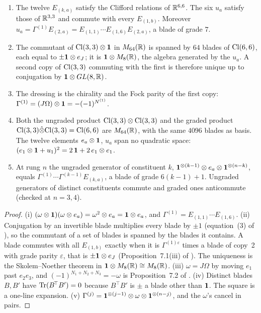 \begin{proposition}
\label{e1:prop:copies}
\begin{enumerate}[label=(\roman*),leftmargin=2.2em]
\item The twelve $E_{(k,a)}$ satisfy the Clifford relations of $\mathbb{R}^{6,6}$. The six $u_a$ satisfy those of $\mathbb{R}^{3,3}$ and commute with every
$E_{(1,b)}$. Moreover $u_a=\Gamma^{(1)}E_{(2,a)}=E_{(1,1)}\cdots E_{(1,6)}E_{(2,a)}$, a blade of grade $7$.
\item The commutant of $\mathrm{Cl}(3,3)\otimes\mathbf 1$ in $M_{64}(\mathbb{R})$ is spanned by $64$ blades of $\mathrm{Cl}(6,6)$, each equal to $\pm\mathbf 1\otimes e_J$; it is
$\mathbf 1\otimes M_8(\mathbb{R})$, the algebra generated by the $u_a$. A second copy of $\mathrm{Cl}(3,3)$ commuting with the first is therefore unique up to
conjugation by $\mathbf 1\otimes GL(8,\mathbb{R})$.
\item The dressing is the chirality and the Fock parity of the first copy: $\Gamma^{(1)}=(J\Omega)\otimes\mathbf 1=-(-1)^{N^{(1)}}$.
\item Both the ungraded product $\mathrm{Cl}(3,3)\otimes\mathrm{Cl}(3,3)$ and the graded product $\mathrm{Cl}(3,3)\hat\otimes\mathrm{Cl}(3,3)=\mathrm{Cl}(6,6)$ are $M_{64}(\mathbb{R})$, with
the same $4096$ blades as basis. The twelve elements $e_a\otimes\mathbf 1$, $u_a$ span no quadratic space: $(e_1\otimes\mathbf 1+u_1)^2=2\,\mathbf 1+2\,e_1\otimes e_1$.
\item At rung $n$ the ungraded generator of constituent $k$, $\mathbf 1^{\otimes(k-1)}\otimes e_a\otimes\mathbf 1^{\otimes(n-k)}$, equals
$\Gamma^{(1)}\cdots\Gamma^{(k-1)}E_{(k,a)}$, a blade of grade $6(k-1)+1$. Ungraded generators of distinct constituents commute and graded
ones anticommute (checked at $n=3,4$).
\end{enumerate}
\end{proposition}

\begin{proof}
(i) $(\omega\otimes\mathbf 1)(\omega\otimes e_a)=\omega^2\otimes e_a=\mathbf 1\otimes e_a$, and $\Gamma^{(1)}=E_{(1,1)}\cdots E_{(1,6)}$. (ii) Conjugation by an
invertible blade multiplies every blade by $\pm1$ (equation~(3) of \cite{ES17}), so the commutant of a set of blades is spanned by the
blades it contains. A blade commutes with all $E_{(1,b)}$ exactly when it is $\Gamma^{(1)\varepsilon}$ times a blade of copy~2 with grade
parity $\varepsilon$, that is $\pm\mathbf 1\otimes e_J$ (Proposition~7.1(iii) of \cite{RE}). The uniqueness is the Skolem--Noether theorem in
$\mathbf 1\otimes M_8(\mathbb{R})\cong M_8(\mathbb{R})$. (iii) $\omega=J\Omega$ by moving $e_1$ past $e_2e_3$, and $(-1)^{N_1+N_2+N_3}=-\omega$ is Proposition~7.2
of \cite{RE}. (iv) Distinct blades $B,B'$ have $\operatorname{Tr}(B^{\!\top}B')=0$ because $B^{\!\top}B'$ is $\pm$ a blade other than $\mathbf 1$. The square is
a one-line expansion. (v) $\Gamma^{(j)}=\mathbf 1^{\otimes(j-1)}\otimes\omega\otimes\mathbf 1^{\otimes(n-j)}$, and the $\omega$'s cancel in pairs.
\end{proof}

